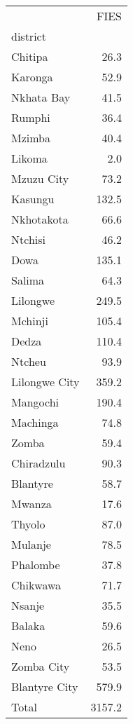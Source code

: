 \begin{tabular}{lr}
\toprule
{} &    FIES \\
district      &         \\
\midrule
Chitipa       &    26.3 \\
Karonga       &    52.9 \\
Nkhata Bay    &    41.5 \\
Rumphi        &    36.4 \\
Mzimba        &    40.4 \\
Likoma        &     2.0 \\
Mzuzu City    &    73.2 \\
Kasungu       &   132.5 \\
Nkhotakota    &    66.6 \\
Ntchisi       &    46.2 \\
Dowa          &   135.1 \\
Salima        &    64.3 \\
Lilongwe      &   249.5 \\
Mchinji       &   105.4 \\
Dedza         &   110.4 \\
Ntcheu        &    93.9 \\
Lilongwe City &   359.2 \\
Mangochi      &   190.4 \\
Machinga      &    74.8 \\
Zomba         &    59.4 \\
Chiradzulu    &    90.3 \\
Blantyre      &    58.7 \\
Mwanza        &    17.6 \\
Thyolo        &    87.0 \\
Mulanje       &    78.5 \\
Phalombe      &    37.8 \\
Chikwawa      &    71.7 \\
Nsanje        &    35.5 \\
Balaka        &    59.6 \\
Neno          &    26.5 \\
Zomba City    &    53.5 \\
Blantyre City &   579.9 \\
Total         &  3157.2 \\
\bottomrule
\end{tabular}

